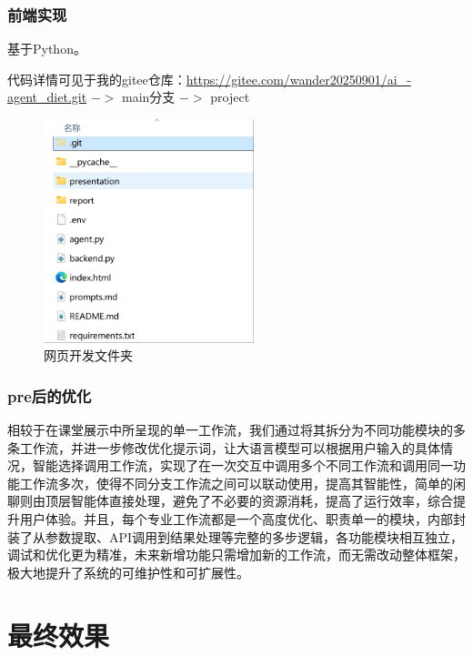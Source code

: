 \documentclass[a4paper,UTF8]{ctexart}
\begin{document}
\subsubsection{前端实现}
基于Python。
\par
代码详情可见于我的gitee仓库：\url{https://gitee.com/wander20250901/ai_-agent_diet.git} $->$ main分支 $->$ project
\begin{figure}[H]
    \centering
    \includegraphics[width=0.55\linewidth, height=6.5cm]{5-1.png}
    \caption{网页开发文件夹}
    \label{fig:diet_recommend}
\end{figure}

\subsubsection{pre后的优化}
相较于在课堂展示中所呈现的单一工作流，我们通过将其拆分为不同功能模块的多条工作流，并进一步修改优化提示词，让大语言模型可以根据用户输入的具体情况，智能选择调用工作流，实现了在一次交互中调用多个不同工作流和调用同一功能工作流多次，使得不同分支工作流之间可以联动使用，提高其智能性，简单的闲聊则由顶层智能体直接处理，避免了不必要的资源消耗，提高了运行效率，综合提升用户体验。并且，每个专业工作流都是一个高度优化、职责单一的模块，内部封装了从参数提取、API调用到结果处理等完整的多步逻辑，各功能模块相互独立，调试和优化更为精准，未来新增功能只需增加新的工作流，而无需改动整体框架，极大地提升了系统的可维护性和可扩展性。


\section{最终效果}
\end{document}
